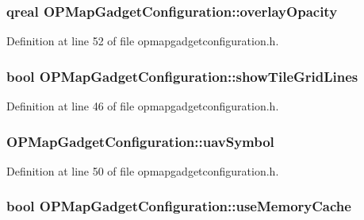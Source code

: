 \hypertarget{group___o_p_map_plugin_gaf1bf43458d17cdb95a80a889c5508945}{
\subsubsection[{overlay\-Opacity}]{\setlength{\rightskip}{0pt plus 5cm}qreal {\bf \-O\-P\-Map\-Gadget\-Configuration\-::overlay\-Opacity}}}\label{group___o_p_map_plugin_gaf1bf43458d17cdb95a80a889c5508945}


\-Definition at line 52 of file opmapgadgetconfiguration.\-h.

\hypertarget{group___o_p_map_plugin_gaa46dc27228fb9c47c0c10f520d6099ab}{
\subsubsection[{show\-Tile\-Grid\-Lines}]{\setlength{\rightskip}{0pt plus 5cm}bool {\bf \-O\-P\-Map\-Gadget\-Configuration\-::show\-Tile\-Grid\-Lines}}}\label{group___o_p_map_plugin_gaa46dc27228fb9c47c0c10f520d6099ab}


\-Definition at line 46 of file opmapgadgetconfiguration.\-h.

\hypertarget{group___o_p_map_plugin_ga34e796aad89f226209a7325c28af859a}{
\subsubsection[{uav\-Symbol}]{ {\bf \-O\-P\-Map\-Gadget\-Configuration\-::uav\-Symbol}}}\label{group___o_p_map_plugin_ga34e796aad89f226209a7325c28af859a}


\-Definition at line 50 of file opmapgadgetconfiguration.\-h.

\hypertarget{group___o_p_map_plugin_gae936e72883265ab40e9b30a0baaed122}{
\subsubsection[{use\-Memory\-Cache}]{\setlength{\rightskip}{0pt plus 5cm}bool {\bf \-O\-P\-Map\-Gadget\-Configuration\-::use\-Memory\-Cache}}}\label{group___o_p_map_plugin_gae936e72883265ab40e9b30a0baaed122}


